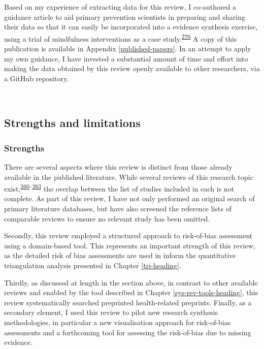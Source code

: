 \documentclass[a4paper, twoside]{templates/ociamthesis}
\begin{document}
Based on my experience of extracting data for this review, I co-authored a guidance article to aid primary prevention scientists in preparing and sharing their data so that it can easily be incorporated into a evidence synthesis exercise, using a trial of mindfulness interventions as a case study.\textsuperscript{\protect\hyperlink{ref-hennessy2021}{276}} A copy of this publication is available in Appendix \ref{published-papers}. In an attempt to apply my own guidance, I have invested a substantial amount of time and effort into making the data obtained by this review openly available to other researchers, via a GitHub repository.

~

\hypertarget{strengths-and-limitations}{%
\subsection{Strengths and limitations}\label{strengths-and-limitations}}

\hypertarget{strengths}{%
\subsubsection{Strengths}\label{strengths}}

There are several aspects where this review is distinct from those already available in the published literature. While several reviews of this research topic exist,\textsuperscript{\protect\hyperlink{ref-chu2018}{260}--\protect\hyperlink{ref-poly2020}{263}} the overlap between the list of studies included in each is not complete. As part of this review, I have not only performed an original search of primary literature databases, but have also screened the reference lists of comparable reviews to ensure no relevant study has been omitted.

Secondly, this review employed a structured approach to risk-of-bias assessment using a domain-based tool. This represents an important strength of this review, as the detailed risk of bias assessments are used in inform the quantitative triangulation analysis presented in Chapter \ref{tri-heading}.

Thirdly, as discussed at length in the section above, in contrast to other available reviews and enabled by the tool described in Chapter \ref{sys-rev-tools-heading}, this review systematically searched preprinted health-related preprints. Finally, as a secondary element, I used this review to pilot new research synthesis methodologies, in particular a new visualisation approach for risk-of-bias assessments and a forthcoming tool for assessing the risk-of-bias due to missing evidence.
\end{document}
